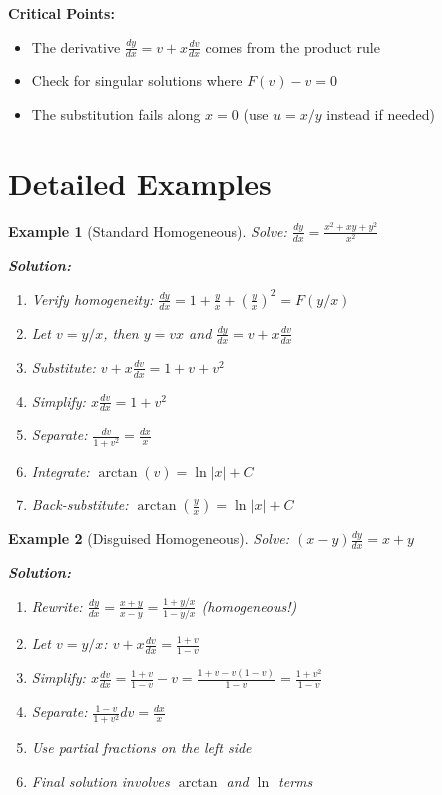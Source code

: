 \documentclass[12pt]{article}
\newtheorem{example}{Example}
\begin{document}
\begin{warning}
\textbf{Critical Points:}
\begin{itemize}
    \item The derivative $\frac{dy}{dx} = v + x\frac{dv}{dx}$ comes from the product rule
    \item Check for singular solutions where $F(v) - v = 0$
    \item The substitution fails along $x = 0$ (use $u = x/y$ instead if needed)
\end{itemize}
\end{warning}

\section{Detailed Examples}

\begin{example}[Standard Homogeneous]
Solve: $\frac{dy}{dx} = \frac{x^2 + xy + y^2}{x^2}$

\textbf{Solution:}
\begin{enumerate}
    \item Verify homogeneity: $\frac{dy}{dx} = 1 + \frac{y}{x} + \left(\frac{y}{x}\right)^2 = F(y/x)$ \checkmark
    \item Let $v = y/x$, then $y = vx$ and $\frac{dy}{dx} = v + x\frac{dv}{dx}$
    \item Substitute: $v + x\frac{dv}{dx} = 1 + v + v^2$
    \item Simplify: $x\frac{dv}{dx} = 1 + v^2$
    \item Separate: $\frac{dv}{1 + v^2} = \frac{dx}{x}$
    \item Integrate: $\arctan(v) = \ln|x| + C$
    \item Back-substitute: $\arctan\left(\frac{y}{x}\right) = \ln|x| + C$
\end{enumerate}
\end{example}

\begin{example}[Disguised Homogeneous]
Solve: $(x - y)\frac{dy}{dx} = x + y$

\textbf{Solution:}
\begin{enumerate}
    \item Rewrite: $\frac{dy}{dx} = \frac{x + y}{x - y} = \frac{1 + y/x}{1 - y/x}$ (homogeneous!)
    \item Let $v = y/x$: $v + x\frac{dv}{dx} = \frac{1 + v}{1 - v}$
    \item Simplify: $x\frac{dv}{dx} = \frac{1 + v}{1 - v} - v = \frac{1 + v - v(1 - v)}{1 - v} = \frac{1 + v^2}{1 - v}$
    \item Separate: $\frac{1 - v}{1 + v^2}dv = \frac{dx}{x}$
    \item Use partial fractions on the left side
    \item Final solution involves $\arctan$ and $\ln$ terms
\end{enumerate}
\end{example}
\end{document}
